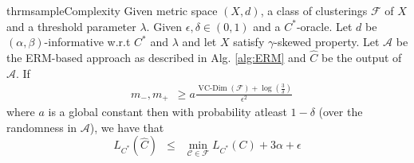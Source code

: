 \documentclass[12pt]{article}
\newcommand{\mc}{\mathcal}
\DeclareMathOperator*{\vcdim}{VC-Dim}
\begin{document}
\begin{restatable}{thrm}{sampleComplexity}
Given metric space $(X, d)$, a class of clusterings $\mc F$ of $X$ and a threshold parameter $\lambda$. Given $\epsilon, \delta \in (0, 1)$ and a $C^*$-oracle. Let $d$ be $(\alpha, \beta)$-informative w.r.t $C^*$ and $\lambda$ and let $X$ satisfy $\gamma$-skewed property. Let $\mc A$ be the ERM-based approach as described in Alg. \ref{alg:ERM} and $\hat C$ be the output of $\mc A$. If  
\label{thm:sampleComplexity}
\begin{align}
  &m_-, m_+ \enspace \ge a\frac{\vcdim({\mc F}) + \log(\frac{3}{\delta})}{\epsilon^2} 
\end{align}
where $a$ is a global constant then with probability atleast $1-\delta$ (over the randomness in $\mc A$), we have that $$L_{C^*}(\hat C) \enspace\le\enspace \min_{\mc C \in \mc F} L_{C^*}(C) + 3\alpha + \epsilon$$
\end{restatable}
\end{document}
